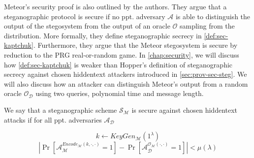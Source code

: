 Meteor's security proof is also outlined by the authors.
They argue that a steganographic protocol is secure if no ppt. adversary $\mathcal{A}$ is able to distinguish the output of the stegosystem from the output of an oracle $\mathcal{O}$ sampling from the distribution.
More formally, they define steganographic secrecy in \autoref{def:sec-kaptchuk}.
Furthermore, they argue that the Meteor stegosystem is secure by reduction to the PRG real-or-random game. 
In \autoref{chap:security}, we will discuss how \autoref{def:sec-kaptchuk} is weaker than Hopper's definition of steganographic secrecy against chosen hiddentext attackers introduced in \autoref{sec:prov-sec-steg}.
We will also discuss how an attacker can distinguish Meteor's output from a random oracle $\mathcal{O}_{\mathcal{D}}$ using two queries, polynomial time and message length.

\begin{definition}%
	\label{def:sec-kaptchuk}%
	We say that a steganographic scheme $\mathcal{S}_{\mathcal{M}}$ is secure against chosen hiddentext attacks if for all ppt. adversaries $\mathcal{A}_{\mathcal{D}}$
	
	$$k \leftarrow KeyGen_{\mathcal{M}}(1^\lambda)$$
	$$\left| \mathop{Pr}\left[ \mathcal{A}_{\mathcal{M}}^{Encode_{\mathcal{M}}(k, \cdot, \cdot)}=1 \right] - \mathop{Pr}\left[ \mathcal{A}_{\mathcal{D}}^{\mathcal{O}_{\mathcal{M}}(\cdot, \cdot)}=1 \right] \right| < \mu(\lambda)$$
\end{definition}
